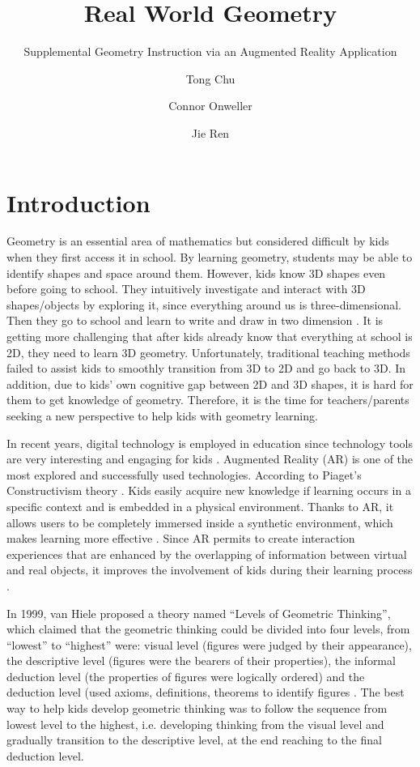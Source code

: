 \documentclass[acmsmall, nonacm]{acmart}
\title{Real World Geometry}
\subtitle{Supplemental Geometry Instruction via an Augmented Reality Application}
\author{Tong Chu}
\author{Connor Onweller}
\author{Jie Ren}
\begin{document}
\maketitle

\section{Introduction}
\label{sec:introduction}

Geometry is an essential area of mathematics but considered difficult by kids
when they first access it in school.  By learning geometry, students may be able
to identify shapes and space around them.  However, kids know 3D shapes even
before going to school.  They intuitively investigate and interact with 3D
shapes/objects by exploring it, since everything around us is three-dimensional.
Then they go to school and learn to write and draw in two dimension
\cite{AR-3D-geometry}.  It is getting more challenging that after kids already
know that everything at school is 2D, they need to learn 3D geometry.
Unfortunately, traditional teaching methods failed to assist kids to smoothly
transition from 3D to 2D and go back to 3D.  In addition, due to kids’ own
cognitive gap between 2D and 3D shapes, it is hard for them to get knowledge of
geometry.  Therefore, it is the time for teachers/parents seeking a new
perspective to help kids with geometry learning.

In recent years, digital technology is employed in education since technology
tools are very interesting and engaging for kids \cite{game-based,
using-games-learning, game-based-learning, adaptive}. Augmented Reality (AR) is
one of the most explored and successfully used technologies.  According to
Piaget’s Constructivism theory \cite{psych-child}.  Kids easily acquire new
knowledge if learning occurs in a specific context and is embedded in a physical
environment.  Thanks to AR, it allows users to be completely immersed inside a
synthetic environment, which makes learning more effective
\cite{situated-learning}.  Since AR permits to create interaction experiences
that are enhanced by the overlapping of information between virtual and real
objects, it improves the involvement of kids during their learning process
\cite{AR-support-geometry}.

In 1999, van Hiele proposed a theory named “Levels of Geometric Thinking”, which
claimed that the geometric thinking could be divided into four levels, from
“lowest” to “highest” were: visual level (figures were judged by their
appearance), the descriptive level (figures were the bearers of their
properties), the informal deduction level (the properties of figures were
logically ordered) and the deduction level (used axioms, definitions, theorems
to identify figures \cite{developing-geometric-thinking}.  The best way to help
kids develop geometric thinking was to follow the sequence from lowest level to
the highest, i.e. developing thinking from the visual level and gradually
transition to the descriptive level, at the end reaching to the final deduction
level.
\end{document}
